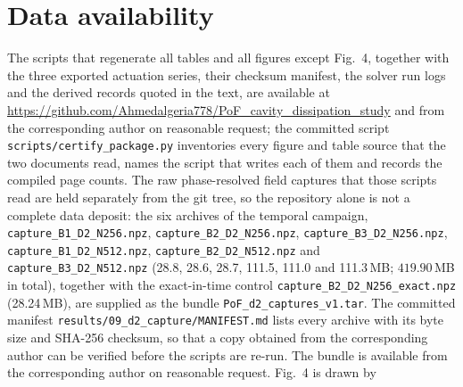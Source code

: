 \documentclass[11pt,a4paper]{article}
\begin{document}
\section*{Data availability}

The scripts that regenerate all tables and all figures except Fig.~4, together
with the three exported actuation series, their checksum manifest, the solver run
logs and the derived records quoted in the text, are available at
\url{https://github.com/Ahmedalgeria778/PoF_cavity_dissipation_study} and from the
corresponding author on reasonable request; the committed script
\texttt{scripts/}\hspace{0pt}\texttt{certify\_package.py} inventories every figure and
table source that the two documents read, names the script that writes each of them
and records the compiled page counts. The raw phase-resolved field captures
that those scripts read are held separately from the git tree, so the
repository alone is not a complete data deposit: the six archives of the temporal
campaign, \texttt{capture\_B1}\hspace{0pt}\texttt{\_D2\_N256.npz},
\texttt{capture\_B2}\hspace{0pt}\texttt{\_D2\_N256.npz},
\texttt{capture\_B3}\hspace{0pt}\texttt{\_D2\_N256.npz},
\texttt{capture\_B1}\hspace{0pt}\texttt{\_D2\_N512.npz},
\texttt{capture\_B2}\hspace{0pt}\texttt{\_D2\_N512.npz} and
\texttt{capture\_B3}\hspace{0pt}\texttt{\_D2\_N512.npz}
(28.8, 28.6, 28.7, 111.5, 111.0 and 111.3\,MB; $419.90$\,MB in total), together with
the exact-in-time control
\texttt{capture\_B2}\hspace{0pt}\texttt{\_D2\_N256}\hspace{0pt}\texttt{\_exact.npz}
(28.24\,MB), are supplied as the bundle
\texttt{PoF\_d2}\hspace{0pt}\texttt{\_captures}\hspace{0pt}\texttt{\_v1.tar}. The
committed manifest
\texttt{results/09\_d2}\hspace{0pt}\texttt{\_capture/MANIFEST.md} lists every
archive with its byte size and SHA-256 checksum, so that a copy obtained from the
corresponding author can be verified before the scripts are re-run. The bundle is
available from the corresponding author on reasonable request. Fig.~4 is drawn by
\end{document}
